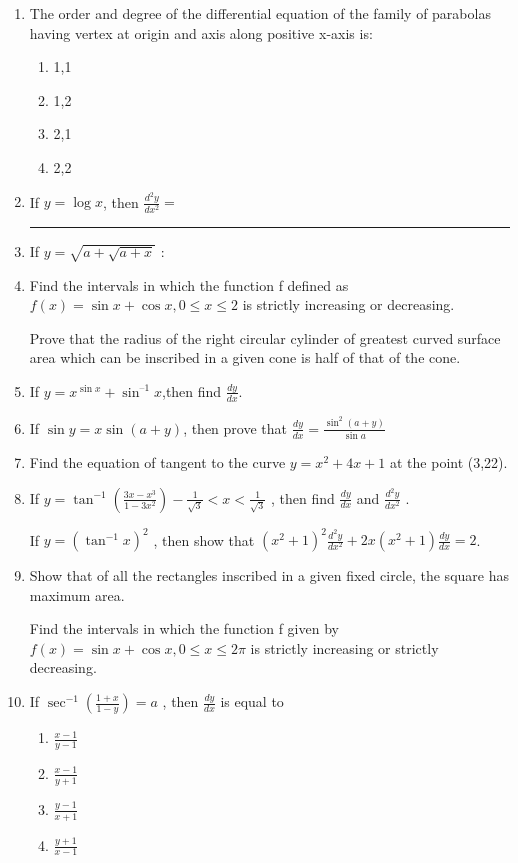 \begin{enumerate}[label=\thesection.\arabic*.,ref=\thesection.\theenumi]

\item The order and degree of the differential equation of the family of parabolas having vertex at origin and axis along positive x-axis is:


\begin{enumerate}
\item 1,1
\item 1,2
\item 2,1
\item 2,2
\end{enumerate}

\item If $y = \log x$, then $\frac{d^2y}{dx^2}=$ \rule{30pt}{1pt}

\item If $y=\sqrt{a+\sqrt{a+x}}$ :

\item Find the intervals in which the function f defined as $f(x) = \sin x + \cos x, 0\le x \le 2$ is strictly increasing or decreasing.

Prove that the radius of the right circular cylinder of greatest curved surface area which can be inscribed in a given cone is half of that of the cone.

\item If $y=x^{\sin x}+\sin^{–1}x$,then find $\frac{dy}{dx}$.

\item If $\sin y=x\sin(a+y)$, then prove that $\frac{dy}{dx}=\frac{\sin^2(a+y)}{\sin a}$ 


\item Find the equation of tangent to the curve $y=x^2+4x+1$ at the point (3,22).



\item If $y=\tan^{-1}(\frac{3x-x^3}{1-3x^2})-\frac{1}{\sqrt{3}}<x<\frac{1}{\sqrt{3}}$ , then find $\frac{dy}{dx}$ and $\frac{d^2y}{dx^2}$ .


    
If $y=(\tan^{-1} x)^2$ , then show that $(x^2+1)^2 \frac{d^2y}{dx^2}+2x(x^2+1) \frac{dy}{dx}=2$.

\item Show that of all the rectangles inscribed in a given fixed circle, the square has maximum area.
  

Find the intervals in which the function f given by $f(x)=\sin x+\cos x, 0 \le x \le 2\pi$ is strictly increasing or strictly decreasing.


\item If $\sec^{-1}(\frac{1+x}{1-y})=a$ , then $\frac{dy}{dx}$ is equal to
\begin{enumerate}
\item $\frac{x-1}{y-1}$
\item $\frac{x-1}{y+1}$
\item $\frac{y-1}{x+1}$
\item $\frac{y+1}{x-1}$
\end{enumerate}

\end{enumerate}


